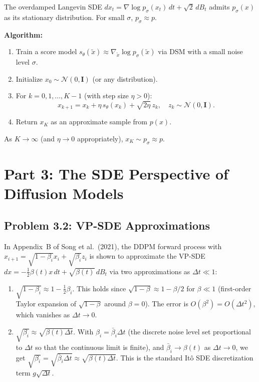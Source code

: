\documentclass[11pt]{article}
\newcommand{\N}{\mathcal{N}}
\newcommand{\sth}{s_\theta}
\begin{document}
The overdamped Langevin SDE $dx_t = \nabla\log p_\sigma(x_t)\,dt + \sqrt{2}\,dB_t$
admits $p_\sigma(x)$ as its stationary distribution. For small $\sigma$, $p_\sigma\approx p$.

\textbf{Algorithm:}
\begin{enumerate}
\setlength{\itemsep}{0pt}
\item Train a score model $\sth(\tilde x)\approx\nabla_{\tilde x}\log p_\sigma(\tilde x)$
      via DSM with a small noise level $\sigma$.
\item Initialize $x_0\sim\N(0,\mathbf{I})$ (or any distribution).
\item For $k=0,1,\ldots,K-1$ (with step size $\eta>0$):
      \[x_{k+1} = x_k + \eta\,\sth(x_k) + \sqrt{2\eta}\,z_k,\quad z_k\sim\N(0,\mathbf{I}).\]
\item Return $x_K$ as an approximate sample from $p(x)$.
\end{enumerate}
As $K\to\infty$ (and $\eta\to0$ appropriately), $x_K\sim p_\sigma\approx p$.

\section{Part 3: The SDE Perspective of Diffusion Models}

\subsection{Problem 3.2: VP-SDE Approximations}

In Appendix~B of Song et al.\ (2021), the DDPM forward process with $x_{i+1}=\sqrt{1-\beta_i}x_i+\sqrt{\beta_i}z_i$ is shown to approximate the VP-SDE
$dx = -\tfrac{1}{2}\beta(t)x\,dt + \sqrt{\beta(t)}\,dB_t$
via two approximations as $\Delta t\ll 1$:

\begin{enumerate}
\item $\sqrt{1-\beta_i} \approx 1 - \tfrac{1}{2}\beta_i$. \quad
      This holds since $\sqrt{1-\beta}\approx 1-\beta/2$ for $\beta\ll 1$ (first-order Taylor expansion of $\sqrt{1-\beta}$ around $\beta=0$).  The error is $O(\beta^2)=O(\Delta t^2)$, which vanishes as $\Delta t\to 0$.

\item $\sqrt{\beta_i} \approx \sqrt{\beta(t)\Delta t}$. \quad
      With $\beta_i = \bar\beta_i\Delta t$ (the discrete noise level set proportional to $\Delta t$ so that the continuous limit is finite), and $\bar\beta_i\to\beta(t)$ as $\Delta t\to 0$, we get $\sqrt{\beta_i}=\sqrt{\bar\beta_i\Delta t}\approx\sqrt{\beta(t)\Delta t}$.  This is the standard It\^o SDE discretization term $g\sqrt{\Delta t}$.
\end{enumerate}
\end{document}
